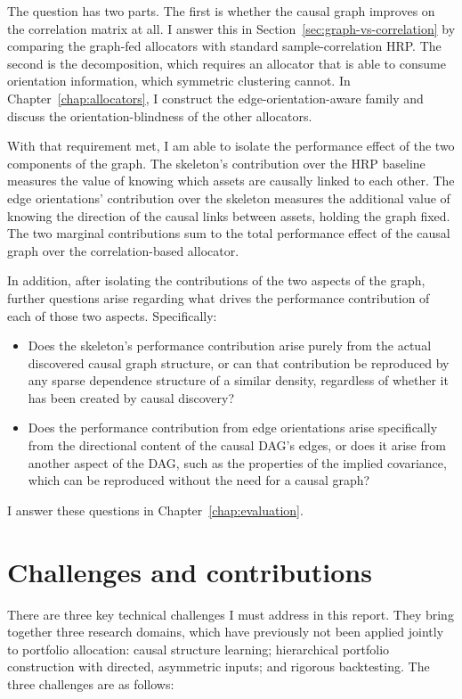 \documentclass[11pt, a4paper]{report}
\begin{document}
The question has two parts. The first is whether the causal graph
improves on the correlation matrix at all. I answer this in
Section~\ref{sec:graph-vs-correlation} by comparing the graph-fed allocators with
standard sample-correlation HRP. The second is the decomposition,
which requires an allocator that is able to
consume orientation information, which symmetric clustering cannot.
In Chapter~\ref{chap:allocators}, I construct the edge-orientation-aware family
and discuss the orientation-blindness of the other allocators. 

With that requirement met, I am able
to isolate the performance effect of the two components of the graph.
The skeleton's contribution over the HRP baseline measures the
value of knowing which assets are causally linked to each other. 
The edge orientations' contribution over the skeleton measures
the additional value of knowing the direction of the causal links
between assets, holding the graph fixed. The two marginal
contributions sum to the total performance effect of the causal
graph over the correlation-based allocator. 

In addition, after isolating the contributions of the two 
aspects of the graph, further questions arise regarding what drives the
performance contribution of each of those two aspects. Specifically:
\begin{itemize}
    \item Does the skeleton's performance contribution arise purely from the 
    actual discovered causal graph structure, or can that contribution
    be reproduced by any sparse dependence structure of a similar density,
    regardless of whether it has been created by causal discovery?
    \item Does the performance contribution from edge orientations
    arise specifically from the directional content of the causal DAG's
    edges, or does it arise from another aspect of the DAG, such as the properties of the
    implied covariance, which can be reproduced without the need for
    a causal graph?
\end{itemize}
\noindent I answer these questions in Chapter~\ref{chap:evaluation}.

\section{Challenges and contributions}
\label{sec:challenges}

There are three key technical challenges I must address in this report.
They bring together three research domains,
which have previously not been applied jointly to portfolio allocation:
causal structure learning; hierarchical portfolio construction with
directed, asymmetric inputs; and rigorous backtesting. The three
challenges are as follows:
\end{document}
